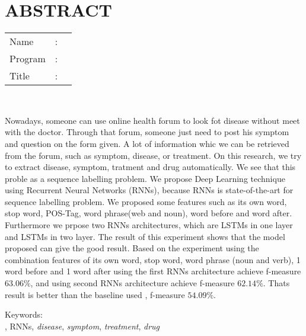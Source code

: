 %
%
%

	\chapter*{ABSTRACT}

\vspace*{0.2cm}

\noindent \begin{tabular}{l l p{11.0cm}}
	Name&: & \penulis \\
	Program&: & \programEng \\
	Title&: & \judulInggris \\
\end{tabular} \\ 

\vspace*{0.5cm}

\noindent 

Nowadays, someone can use online health forum to look fot disease without meet with the doctor. Through that forum, someone just need to post his symptom and question on the form given. A lot of information whic we can be retrieved from the forum, such as symptom, disease, or treatment. On this research, we try to extract disease, symptom, tratment and drug automatically. We see that this proble as a sequence labelling problem. We propose Deep Learning technique using Recurrent Neural Networks (RNNs), because RNNs is state-of-the-art for sequence labelling problem. We proposed some features such as its own word, stop word, POS-Tag, word phrase(web and noun), word before and word after. Furthermore  we prpose two RNNs architectures, which are LSTMs in one layer and LSTMs in two layer. The result of this experiment shows that the model proposed can give the good result. Based on the experiment using the combination features of its own word, stop word, word phrase (noun and verb), 1 word before and 1 word after  using the first RNNs architecture achieve f-measure $ 63.06\% $, and using second RNNs architecture achieve f-measure $ 62.14\% $. Thats result is better than the baseline used \citep{skripsiKakRadit}, f-measure $ 54.09\% $.

\vspace*{0.2cm}

\noindent Keywords: \\ 
\noindent \mer, RNNs, \textit{disease}, \textit{symptom}, \textit{treatment}, \textit{drug} \\ 

\newpage